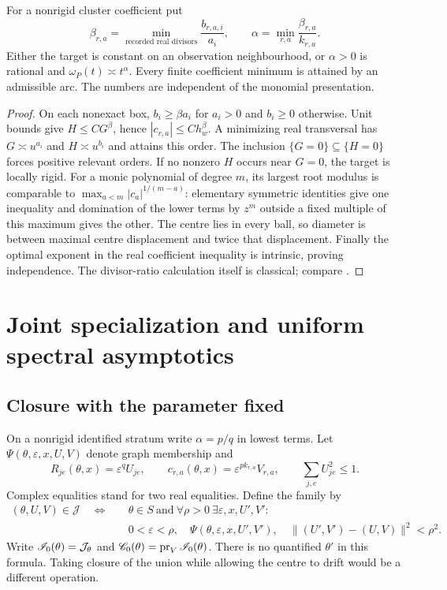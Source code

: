 \begin{corollary}\label{cor:orders}
For a nonrigid cluster coefficient put
\begin{equation}\label{eq:exponent}
 \beta_{r,a}=\min_{\text{recorded real divisors}}\frac{b_{r,a,i}}{a_i},
 \qquad \alpha=\min_{r,a}\frac{\beta_{r,a}}{k_{r,a}}.
\end{equation}
Either the target is constant on an observation neighbourhood, or
$\alpha>0$ is rational and $\omega_P(t)\asymp t^\alpha$.
Every finite coefficient minimum is attained by an admissible arc.
The numbers are independent of the monomial presentation.
\end{corollary}
\begin{proof}
On each nonexact box, $b_i\ge\beta a_i$ for $a_i>0$ and $b_i\ge0$
otherwise. Unit bounds give $H\le C G^\beta$, hence
$|c_{r,a}|\le C h_w^\beta$. A minimizing real transversal has
$G\asymp u^{a_i}$ and $H\asymp u^{b_i}$ and attains this order.
The inclusion $\{G=0\}\subseteq\{H=0\}$ forces positive relevant
orders. If no nonzero $H$ occurs near $G=0$, the target is locally rigid.
For a monic polynomial of degree $m$, its largest root modulus is
comparable to $\max_{a<m}|c_a|^{1/(m-a)}$: elementary symmetric
identities give one inequality and domination of the lower terms by
$z^m$ outside a fixed multiple of this maximum gives the other.
The centre lies in every ball, so diameter is between maximal centre
displacement and twice that displacement. Finally the optimal exponent
in the real coefficient inequality is intrinsic, proving independence.
The divisor-ratio calculation itself is classical; compare \cite{BE09}.
\end{proof}

\section{Joint specialization and uniform spectral asymptotics}\label{sec:joint}
\subsection{Closure with the parameter fixed}
On a nonrigid identified stratum write $\alpha=p/q$ in lowest terms.
Let $\Psi(\theta,\varepsilon,x,U,V)$ denote graph membership and
\begin{equation}\label{eq:weighted}
 R_{je}(\theta,x)=\varepsilon^q U_{je},\qquad
 c_{r,a}(\theta,x)=\varepsilon^{p k_{r,a}}V_{r,a},\qquad
 \sum_{j,e}U_{je}^2\le1.
\end{equation}
Complex equalities stand for two real equalities. Define the family by
\begin{align}
 (\theta,U,V)\in\mathcal J\quad\Longleftrightarrow\quad
 &\theta\in S\ \text{and}\ \forall\rho>0\ \exists\varepsilon,x,U',V':
 \nonumber\\
 &0<\varepsilon<\rho,\quad\Psi(\theta,\varepsilon,x,U',V'),\quad
 \|(U',V')-(U,V)\|^2<\rho^2.\label{eq:closure-formula}
\end{align}
Write $\mathscr I_0(\theta)=\mathcal J_\theta$ and
$\mathscr C_0(\theta)=\operatorname{pr}_V\mathscr I_0(\theta)$. There is no quantified $\theta'$
in this formula. Taking closure of the union while allowing the centre
to drift would be a different operation.

